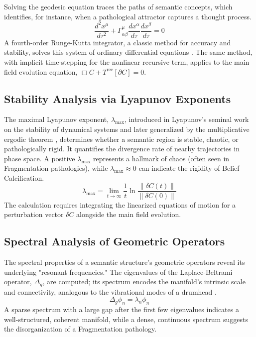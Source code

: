 Solving the geodesic equation traces the paths of semantic concepts, which identifies, for instance, when a pathological attractor captures a thought process.
\begin{equation}
\frac{d^2 x^{\mu}}{d\tau^2} + \Gamma^{\mu}_{\alpha\beta} \frac{dx^{\alpha}}{d\tau} \frac{dx^{\beta}}{d\tau} = 0
\end{equation}
A fourth-order Runge-Kutta integrator, a classic method for accuracy and stability, solves this system of ordinary differential equations \autocite{Runge1895, Kutta1901}. The same method, with implicit time-stepping for the nonlinear recursive term, applies to the main field evolution equation, \(\Box C + T^{\text{rec}}[\partial C] = 0\).

\subsection{Stability Analysis via Lyapunov Exponents}

The maximal Lyapunov exponent, \(\lambda_{\max}\), introduced in Lyapunov's seminal work on the stability of dynamical systems and later generalized by the multiplicative ergodic theorem \autocite{Lyapunov1907, Oseledets1968}, determines whether a semantic region is stable, chaotic, or pathologically rigid. It quantifies the divergence rate of nearby trajectories in phase space. A positive \(\lambda_{\max}\) represents a hallmark of chaos (often seen in Fragmentation pathologies), while \(\lambda_{\max} \approx 0\) can indicate the rigidity of Belief Calcification.
\begin{equation}
\lambda_{\max} = \lim_{t \to \infty} \frac{1}{t} \ln \frac{\|\delta C(t)\|}{\|\delta C(0)\|}
\end{equation}
The calculation requires integrating the linearized equations of motion for a perturbation vector \(\delta C\) alongside the main field evolution.

\subsection{Spectral Analysis of Geometric Operators}

The spectral properties of a semantic structure's geometric operators reveal its underlying "resonant frequencies." The eigenvalues of the Laplace-Beltrami operator, \(\Delta_g\), are computed; its spectrum encodes the manifold's intrinsic scale and connectivity, analogous to the vibrational modes of a drumhead \autocite{Chung1997}.
\begin{equation}
\Delta_g \phi_n = \lambda_n \phi_n
\end{equation}
A sparse spectrum with a large gap after the first few eigenvalues indicates a well-structured, coherent manifold, while a dense, continuous spectrum suggests the disorganization of a Fragmentation pathology.


